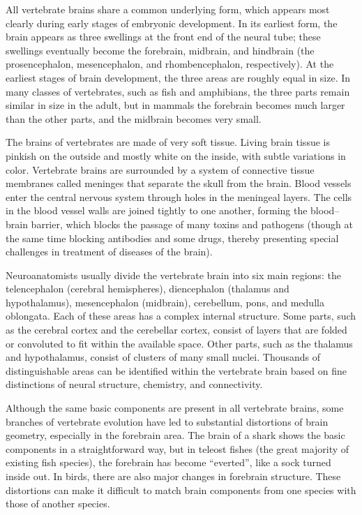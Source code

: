\documentclass[]{book}
\begin{document}
All vertebrate brains share a common underlying form, which appears most clearly during early stages of embryonic development. In its earliest form, the brain appears as three swellings at the front end of the neural tube; these swellings eventually become the forebrain, midbrain, and hindbrain (the prosencephalon, mesencephalon, and rhombencephalon, respectively). At the earliest stages of brain development, the three areas are roughly equal in size. In many classes of vertebrates, such as fish and amphibians, the three parts remain similar in size in the adult, but in mammals the forebrain becomes much larger than the other parts, and the midbrain becomes very small.

The brains of vertebrates are made of very soft tissue. Living brain tissue is pinkish on the outside and mostly white on the inside, with subtle variations in color. Vertebrate brains are surrounded by a system of connective tissue membranes called meninges that separate the skull from the brain. Blood vessels enter the central nervous system through holes in the meningeal layers. The cells in the blood vessel walls are joined tightly to one another, forming the blood--brain barrier, which blocks the passage of many toxins and pathogens (though at the same time blocking antibodies and some drugs, thereby presenting special challenges in treatment of diseases of the brain).

Neuroanatomists usually divide the vertebrate brain into six main regions: the telencephalon (cerebral hemispheres), diencephalon (thalamus and hypothalamus), mesencephalon (midbrain), cerebellum, pons, and medulla oblongata. Each of these areas has a complex internal structure. Some parts, such as the cerebral cortex and the cerebellar cortex, consist of layers that are folded or convoluted to fit within the available space. Other parts, such as the thalamus and hypothalamus, consist of clusters of many small nuclei. Thousands of distinguishable areas can be identified within the vertebrate brain based on fine distinctions of neural structure, chemistry, and connectivity.

Although the same basic components are present in all vertebrate brains, some branches of vertebrate evolution have led to substantial distortions of brain geometry, especially in the forebrain area. The brain of a shark shows the basic components in a straightforward way, but in teleost fishes (the great majority of existing fish species), the forebrain has become ``everted'', like a sock turned inside out. In birds, there are also major changes in forebrain structure. These distortions can make it difficult to match brain components from one species with those of another species.
\end{document}
